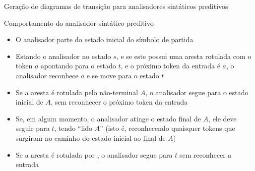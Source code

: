\begin{frame}[fragile]{Geração de diagramas de transição para analisadores sintáticos preditivos}

    \begin{algorithmic}[1]

        \vspace{0.2in}

        \Statex
            \EndFor
        \EndFor
    \end{algorithmic}

\end{frame}

\begin{frame}[fragile]{Comportamento do analisador sintático preditivo}

    \begin{itemize}
        \item O analisador parte do estado inicial do símbolo de partida

        \item Estando o analisador no estado $s$, e se este possui uma aresta rotulada com o token $a$ apontando para o estado $t$, e o próximo token da entrada
            é $a$, o analisador reconhece $a$ e se move para o estado $t$

        \item Se a aresta é rotulada pelo não-terminal $A$, o analisador segue para o estado inicial de $A$, sem reconhecer o próximo token da entrada

        \item Se, em algum momento, o analisador atinge o estado final de $A$, ele deve seguir para $t$, tendo ``lido $A$'' (isto é, reconhecendo quaisquer
            tokens que surgiram no caminho do estado inicial ao final de $A$)

        \item Se a aresta é rotulada por , o analisador segue para $t$ sem reconhecer a entrada
    \end{itemize}

\end{frame}

